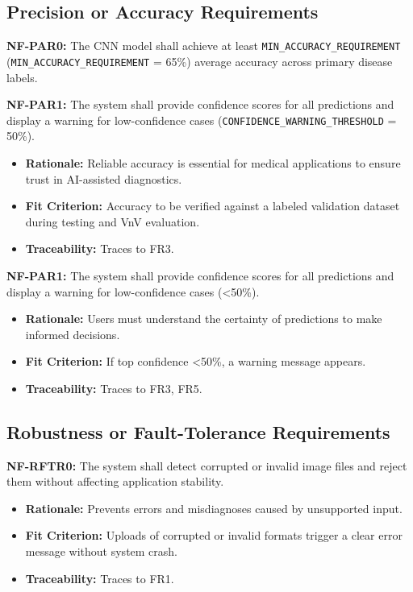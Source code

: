 \documentclass[12pt]{article}
\begin{document}
\subsection{Precision or Accuracy Requirements}

\textbf{NF-PAR0:} The CNN model shall achieve at least \texttt{MIN\_ACCURACY\_REQUIREMENT} (\texttt{MIN\_ACCURACY\_REQUIREMENT} = 65\%) average accuracy across primary disease labels.

\textbf{NF-PAR1:} The system shall provide confidence scores for all predictions and display a warning for low-confidence cases (\texttt{CONFIDENCE\_WARNING\_THRESHOLD} = 50\%).

\begin{itemize}
    \item \textbf{Rationale:} Reliable accuracy is essential for medical applications to ensure trust in AI-assisted diagnostics.
    \item \textbf{Fit Criterion:} Accuracy to be verified against a labeled validation dataset during testing and VnV evaluation.
    \item \textbf{Traceability:} Traces to FR3.
\end{itemize}

\textbf{NF-PAR1:} The system shall provide confidence scores for all predictions and display a warning for low-confidence cases (<50\%).
\begin{itemize}
    \item \textbf{Rationale:} Users must understand the certainty of predictions to make informed decisions.
    \item \textbf{Fit Criterion:} If top confidence <50\%, a warning message appears.
    \item \textbf{Traceability:} Traces to FR3, FR5.
\end{itemize}

\subsection{Robustness or Fault-Tolerance Requirements}

\textbf{NF-RFTR0:} The system shall detect corrupted or invalid image files and reject them without affecting application stability.
\begin{itemize}
    \item \textbf{Rationale:} Prevents errors and misdiagnoses caused by unsupported input.
    \item \textbf{Fit Criterion:} Uploads of corrupted or invalid formats trigger a clear error message without system crash.
    \item \textbf{Traceability:} Traces to FR1.
\end{itemize}
\end{document}
